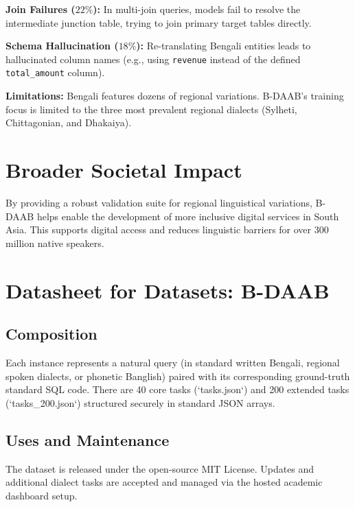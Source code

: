 \documentclass{article}
\begin{document}
\textbf{Join Failures ($22\%$):} In multi-join queries, models fail to resolve the intermediate junction table, trying to join primary target tables directly.

\textbf{Schema Hallucination ($18\%$):} Re-translating Bengali entities leads to hallucinated column names (e.g., using \texttt{revenue} instead of the defined \texttt{total_amount} column).

\textbf{Limitations:} Bengali features dozens of regional variations. B-DAAB's training focus is limited to the three most prevalent regional dialects (Sylheti, Chittagonian, and Dhakaiya).

\section{Broader Societal Impact}
By providing a robust validation suite for regional linguistical variations, B-DAAB helps enable the development of more inclusive digital services in South Asia. This supports digital access and reduces linguistic barriers for over 300 million native speakers.




\newpage
\appendix
\section{Datasheet for Datasets: B-DAAB}

\subsection{Composition}
Each instance represents a natural query (in standard written Bengali, regional spoken dialects, or phonetic Banglish) paired with its corresponding ground-truth standard SQL code. 
There are 40 core tasks (`tasks.json`) and 200 extended tasks (`tasks_200.json`) structured securely in standard JSON arrays.

\subsection{Uses and Maintenance}
The dataset is released under the open-source MIT License. Updates and additional dialect tasks are accepted and managed via the hosted academic dashboard setup.
\end{document}

